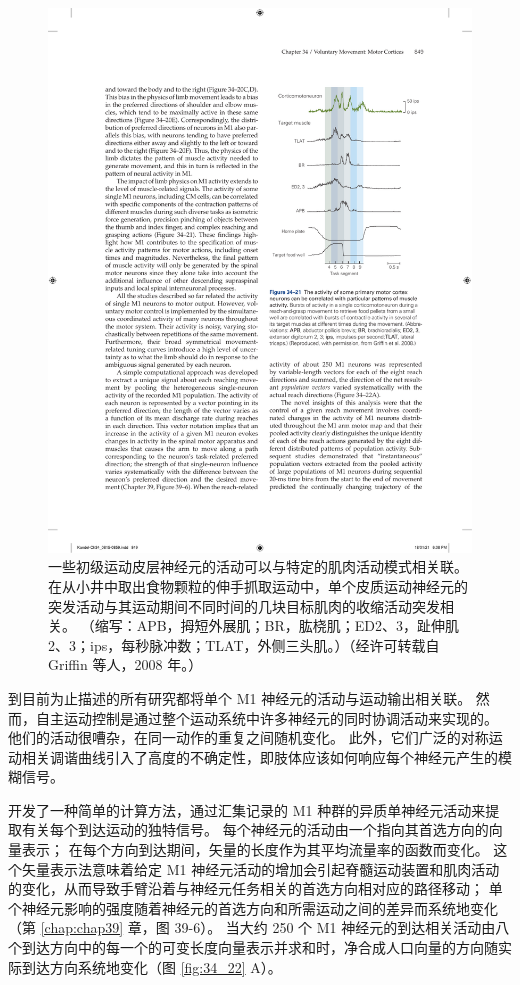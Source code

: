 \begin{figure}[htbp]
	\centering
	\includegraphics[width=0.5\linewidth]{chap34/fig_34_21}
	\caption{一些初级运动皮层神经元的活动可以与特定的肌肉活动模式相关联。 在从小井中取出食物颗粒的伸手抓取运动中，单个皮质运动神经元的突发活动与其运动期间不同时间的几块目标肌肉的收缩活动突发相关。 （缩写：APB，拇短外展肌；BR，肱桡肌；ED2、3，趾伸肌 2、3；ips，每秒脉冲数；TLAT，外侧三头肌。）（经许可转载自 Griffin 等人，2008 年。）}
	\label{fig:34_21}
\end{figure}

到目前为止描述的所有研究都将单个 M1 神经元的活动与运动输出相关联。 然而，自主运动控制是通过整个运动系统中许多神经元的同时协调活动来实现的。 他们的活动很嘈杂，在同一动作的重复之间随机变化。 此外，它们广泛的对称运动相关调谐曲线引入了高度的不确定性，即肢体应该如何响应每个神经元产生的模糊信号。

开发了一种简单的计算方法，通过汇集记录的 M1 种群的异质单神经元活动来提取有关每个到达运动的独特信号。 每个神经元的活动由一个指向其首选方向的向量表示； 在每个方向到达期间，矢量的长度作为其平均流量率的函数而变化。 这个矢量表示法意味着给定 M1 神经元活动的增加会引起脊髓运动装置和肌肉活动的变化，从而导致手臂沿着与神经元任务相关的首选方向相对应的路径移动； 单个神经元影响的强度随着神经元的首选方向和所需运动之间的差异而系统地变化（第 \ref{chap:chap39} 章，图 39-6）。 
当大约 250 个 M1 神经元的到达相关活动由八个到达方向中的每一个的可变长度向量表示并求和时，净合成人口向量的方向随实际到达方向系统地变化（图 \ref{fig:34_22} A）。

